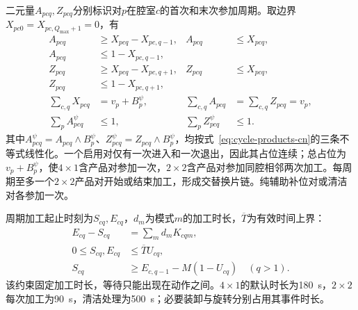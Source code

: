 \documentclass[final,5p,times,twocolumn]{elsarticle}
\begin{document}
二元量$A_{pcq},Z_{pcq}$分别标识对$p$在腔室$c$的首次和末次参加周期。取边界$X_{pc0}=X_{pc,Q_{\max}+1}=0$，有
\begin{equation}
\begin{aligned}
A_{pcq}&\ge X_{pcq}-X_{pc,q-1}, &A_{pcq}&\le X_{pcq},\\
A_{pcq}&\le1-X_{pc,q-1},\\
Z_{pcq}&\ge X_{pcq}-X_{pc,q+1}, &Z_{pcq}&\le X_{pcq},\\
Z_{pcq}&\le1-X_{pc,q+1},\\
\sum_{c,q}X_{pcq}&=v_p+B_p^{\psi}, &\sum_{c,q}A_{pcq}&=\sum_{c,q}Z_{pcq}=v_p,\\
\sum_pA^{\psi}_{pcq}&\le1, &\sum_pZ^{\psi}_{pcq}&\le1.
\end{aligned}
\label{eq:cycle-exposures-cn}
\end{equation}
其中$A^{\psi}_{pcq}=A_{pcq}\land B_p^{\psi}$、$Z^{\psi}_{pcq}=Z_{pcq}\land B_p^{\psi}$，均按式~\eqref{eq:cycle-products-cn}的三条不等式线性化。一个启用对仅有一次进入和一次退出，因此其占位连续；总占位为$v_p+B_p^{\psi}$，使$4\times1$含产品对参加一次，$2\times2$含产品对参加同腔相邻两次加工。每周期至多一个$2\times2$产品对开始或结束加工，形成交替换片链。纯辅助补位对或清洁对各参加一次。

周期加工起止时刻为$S_{cq},E_{cq}$，$d_m$为模式$m$的加工时长，$\overline T$为有效时间上界：
\begin{equation}
\begin{aligned}
E_{cq}-S_{cq}&=\sum_m d_mK_{cqm},\\
0\le S_{cq},E_{cq}&\le\overline T U_{cq},\\
S_{cq}&\ge E_{c,q-1}-M(1-U_{cq})\quad(q>1).
\end{aligned}
\label{eq:cycle-time-cn}
\end{equation}
该约束固定加工时长，等待只能出现在动作之间。$4\times1$的默认时长为180~s，$2\times2$每次加工为90~s，清洁处理为500~s；必要装卸与旋转分别占用其事件时长。
\end{document}
